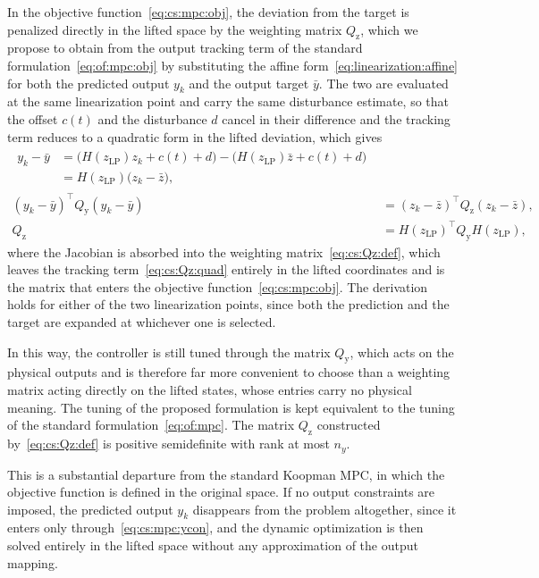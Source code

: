 \documentclass[preprint,12pt,authoryear]{elsarticle}
\theoremstyle{remark}
\newcommand{\ui}[2]{#1_{\text{#2}}}
\begin{document}
In the objective function~\eqref{eq:cs:mpc:obj}, the deviation from the target is penalized directly in the lifted space by the weighting matrix \(\ui{Q}{z}\), which we propose to obtain from the output tracking term of the standard formulation~\eqref{eq:of:mpc:obj} by substituting the affine form~\eqref{eq:linearization:affine} for both the predicted output \(y_k\) and the output target \(\bar{y}\). The two are evaluated at the same linearization point and carry the same disturbance estimate, so that the offset \(c(t)\) and the disturbance \(d\) cancel in their difference and the tracking term reduces to a quadratic form in the lifted deviation, which gives
\begin{subequations}
  \label{eq:cs:Qz}
  \begin{align}
    \begin{split}
      y_k - \bar{y}
        &= \bigl( H(\ui{z}{LP}) z_k + c(t) + d \bigr)
         - \bigl( H(\ui{z}{LP}) \bar{z} + c(t) + d \bigr) \\
        &= H(\ui{z}{LP}) \bigl( z_k - \bar{z} \bigr),
    \end{split} \label{eq:cs:Qz:diff} \\
    (y_k - \bar{y})^\intercal \ui{Q}{y} (y_k - \bar{y}) &= (z_k - \bar{z})^\intercal \ui{Q}{z} (z_k - \bar{z}), \label{eq:cs:Qz:quad} \\
    \ui{Q}{z} &= H(\ui{z}{LP})^\intercal \ui{Q}{y} H(\ui{z}{LP}), \label{eq:cs:Qz:def}
  \end{align}
\end{subequations}
where the Jacobian is absorbed into the weighting matrix~\eqref{eq:cs:Qz:def}, which leaves the tracking term~\eqref{eq:cs:Qz:quad} entirely in the lifted coordinates and is the matrix that enters the objective function~\eqref{eq:cs:mpc:obj}. The derivation holds for either of the two linearization points, since both the prediction and the target are expanded at whichever one is selected.

In this way, the controller is still tuned through the matrix \(\ui{Q}{y}\), which acts on the physical outputs and is therefore far more convenient to choose than a weighting matrix acting directly on the lifted states, whose entries carry no physical meaning. The tuning of the proposed formulation is kept equivalent to the tuning of the standard formulation~\eqref{eq:of:mpc}. The matrix \(\ui{Q}{z}\) constructed by~\eqref{eq:cs:Qz:def} is positive semidefinite with rank at most \(n_y\).

This is a substantial departure from the standard Koopman MPC, in which the objective function is defined in the original space.
If no output constraints are imposed, the predicted output \(y_k\) disappears from the problem altogether, since it enters only through~\eqref{eq:cs:mpc:ycon}, and the dynamic optimization is then solved entirely in the lifted space without any approximation of the output mapping.
\end{document}
